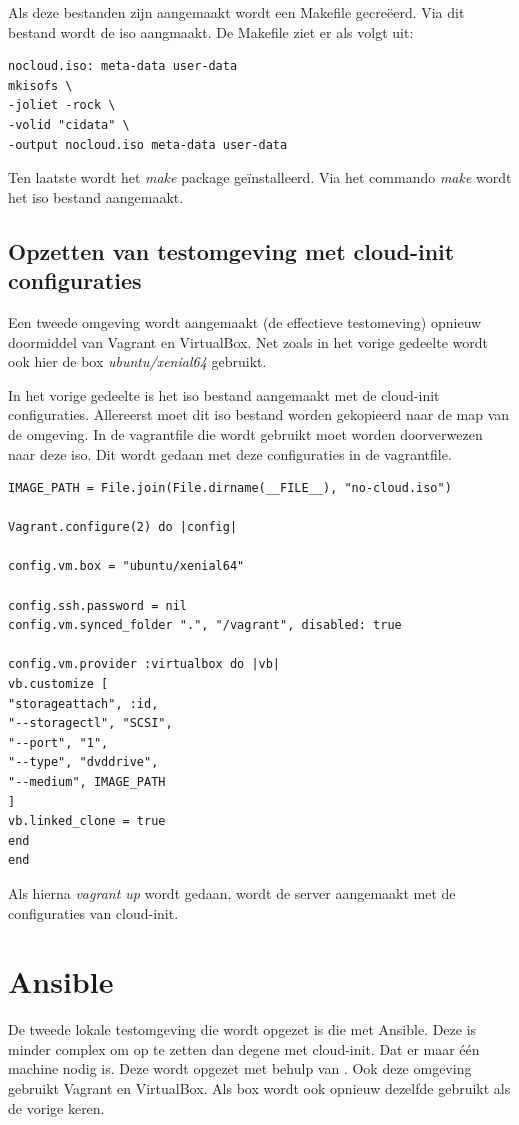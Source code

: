 Als deze bestanden zijn aangemaakt wordt een Makefile gecreëerd. Via dit bestand wordt de iso aangmaakt. De Makefile ziet er als volgt uit:
\begin{lstlisting}
nocloud.iso: meta-data user-data
mkisofs \
-joliet -rock \
-volid "cidata" \
-output nocloud.iso meta-data user-data
\end{lstlisting}

Ten laatste wordt het \textit{make} package geïnstalleerd. Via het commando \textit{make} wordt het iso bestand aangemaakt.

\subsection{Opzetten van testomgeving met cloud-init configuraties}
Een tweede omgeving wordt aangemaakt (de effectieve testomeving) opnieuw doormiddel van Vagrant en VirtualBox. Net zoals in het vorige gedeelte wordt ook hier de box \textit{ubuntu/xenial64} gebruikt.

In het vorige gedeelte is het iso bestand aangemaakt met de cloud-init configuraties. Allereerst moet dit iso bestand worden gekopieerd naar de map van de omgeving. In de vagrantfile die wordt gebruikt moet worden doorverwezen naar deze iso. Dit wordt gedaan met deze configuraties in de vagrantfile.
\begin{lstlisting}
IMAGE_PATH = File.join(File.dirname(__FILE__), "no-cloud.iso")

Vagrant.configure(2) do |config|

config.vm.box = "ubuntu/xenial64"

config.ssh.password = nil	
config.vm.synced_folder ".", "/vagrant", disabled: true

config.vm.provider :virtualbox do |vb|
vb.customize [
"storageattach", :id,
"--storagectl", "SCSI",
"--port", "1",
"--type", "dvddrive",
"--medium", IMAGE_PATH
]
vb.linked_clone = true
end
end
\end{lstlisting}
Als hierna \textit{vagrant up} wordt gedaan, wordt de server aangemaakt met de configuraties van cloud-init.

\section{Ansible}
De tweede lokale testomgeving die wordt opgezet is die met Ansible. Deze is minder complex om op te zetten dan degene met cloud-init. Dat er maar één machine nodig is. Deze wordt opgezet met behulp van \autocite{ansibleVagrant}. Ook deze omgeving gebruikt Vagrant en VirtualBox. Als box wordt ook opnieuw dezelfde gebruikt als de vorige keren. 

